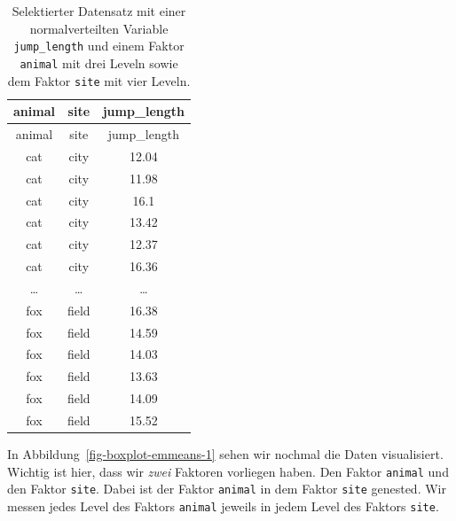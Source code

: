 \documentclass[
  letterpaper,
]{scrbook}
\begin{document}
\hypertarget{tbl-data-emmeans-1}{}
\begin{longtable}[]{@{}ccc@{}}
\caption{\label{tbl-data-emmeans-1}Selektierter Datensatz mit einer
normalverteilten Variable \texttt{jump\_length} und einem Faktor
\texttt{animal} mit drei Leveln sowie dem Faktor \texttt{site} mit vier
Leveln.}\tabularnewline
\toprule()
animal & site & jump\_length \\
\midrule()
\endfirsthead
\toprule()
animal & site & jump\_length \\
\midrule()
\endhead
cat & city & 12.04 \\
cat & city & 11.98 \\
cat & city & 16.1 \\
cat & city & 13.42 \\
cat & city & 12.37 \\
cat & city & 16.36 \\
\ldots{} & \ldots{} & \ldots{} \\
fox & field & 16.38 \\
fox & field & 14.59 \\
fox & field & 14.03 \\
fox & field & 13.63 \\
fox & field & 14.09 \\
fox & field & 15.52 \\
\bottomrule()
\end{longtable}

In Abbildung~\ref{fig-boxplot-emmeans-1} sehen wir nochmal die Daten
visualisiert. Wichtig ist hier, dass wir \emph{zwei} Faktoren vorliegen
haben. Den Faktor \texttt{animal} und den Faktor \texttt{site}. Dabei
ist der Faktor \texttt{animal} in dem Faktor \texttt{site} genested. Wir
messen jedes Level des Faktors \texttt{animal} jeweils in jedem Level
des Faktors \texttt{site}.
\end{document}
